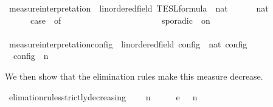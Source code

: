 \begin{isabellebody}
\isamarkupfalse%
\ measure{\isacharunderscore}interpretation\ {\isacharcolon}{\isacharcolon}\ {\isacartoucheopen}{\isacharprime}{\isasymtau}{\isacharcolon}{\isacharcolon}linordered{\isacharunderscore}field\ TESL{\isacharunderscore}formula\ {\isasymRightarrow}\ nat{\isacartoucheclose}\ {\isacharparenleft}{\isachardoublequoteopen}{\isasymmu}{\isachardoublequoteclose}{\isacharparenright}\isanewline
{}\isanewline
\ \ {\isacartoucheopen}{\isasymmu}\ {\isacharbrackleft}{\isacharbrackright}\ {\isacharequal}\ {\isacharparenleft}{}{\isacharcolon}{\isacharcolon}nat{\isacharparenright}{\isacartoucheclose}\isanewline
{\isacharbar}\ {\isacartoucheopen}{\isasymmu}\ {\isacharparenleft}{\isasymphi}\ {\isacharhash}\ {\isasymPhi}{\isacharparenright}\ {\isacharequal}\ {\isacharparenleft}case\ {\isasymphi}\ of\isanewline
\ \ \ \ \ \ \ \ \ \ \ \ \ \ \ \ \ \ \ \ \ \ {\isacharunderscore}\ sporadic\ {\isacharunderscore}\ on\ {\isacharunderscore}\ {\isasymRightarrow}\ {}\ {\isacharplus}\ {\isasymmu}\ {\isasymPhi}\isanewline
\ \ \ \ \ \ \ \ \ \ \ \ \ \ \ \ \ \ \ \ {\isacharbar}\ {\isacharunderscore}\ \ \ \ \ \ \ \ \ \ \ \ \ \ \ \ \ {\isasymRightarrow}\ {}\ {\isacharplus}\ {\isasymmu}\ {\isasymPhi}{\isacharparenright}{\isacartoucheclose}\isanewline
\isanewline
{}\isamarkupfalse%
\ measure{\isacharunderscore}interpretation{\isacharunderscore}config\ {\isacharcolon}{\isacharcolon}\ {\isacartoucheopen}{\isacharprime}{\isasymtau}{\isacharcolon}{\isacharcolon}linordered{\isacharunderscore}field\ config\ {\isasymRightarrow}\ nat{\isacartoucheclose}\ {\isacharparenleft}{\isachardoublequoteopen}{\isasymmu}\isactrlsub c\isactrlsub o\isactrlsub n\isactrlsub f\isactrlsub i\isactrlsub g{\isachardoublequoteclose}{\isacharparenright}\isanewline
{}\isanewline
\ \ {\isacartoucheopen}{\isasymmu}\isactrlsub c\isactrlsub o\isactrlsub n\isactrlsub f\isactrlsub i\isactrlsub g\ {\isacharparenleft}{\isasymGamma}{\isacharcomma}\ n\ {\isasymturnstile}\ {\isasymPsi}\ {\isasymtriangleright}\ {\isasymPhi}{\isacharparenright}\ {\isacharequal}\ {\isasymmu}\ {\isasymPsi}{\isacartoucheclose}%
\begin{isamarkuptext}%
We then show that the elimination rules make this measure decrease.%
\end{isamarkuptext}\isamarkuptrue%
\isamarkupfalse%
\ elimation{\isacharunderscore}rules{\isacharunderscore}strictly{\isacharunderscore}decreasing{\isacharcolon}\isanewline
\ \ \ {\isacartoucheopen}{\isacharparenleft}{\isasymGamma}\ n\ {\isasymturnstile}\ {\isasymPsi}\ {\isasymtriangleright}\ {\isasymPhi}\ \ {\isasymhookrightarrow}\isactrlsub e\ \ {\isacharparenleft}{\isasymGamma}\ n\ {\isasymturnstile}\ {\isasymPsi}\ {\isasymtriangleright}\ {\isasymPhi}\isanewline

\end{isabellebody}
